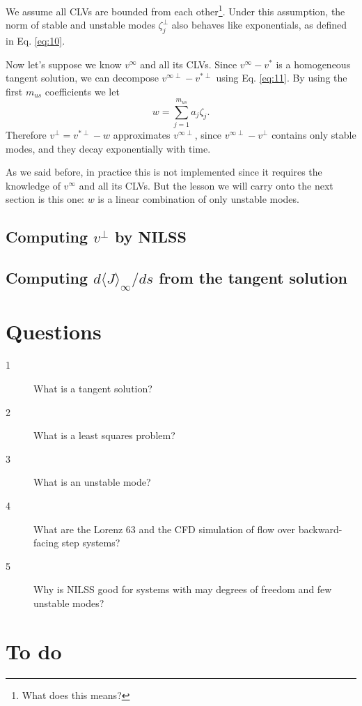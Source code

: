 \documentclass[10pt,twoside,a4paper]{article} %
\begin{document}
We assume all CLVs are bounded from each other\footnote{What does this means?}. Under this assumption, the norm of stable and unstable modes ${\zeta_j^\perp}$ also behaves like exponentials, as defined in Eq. \ref{eq:10}.

Now let's suppose we know $v^\infty$ and all its CLVs. Since $v^\infty - v^*$ is a homogeneous tangent solution, we can decompose $v^{\infty \perp} - v^{*\perp}$ using Eq. \ref{eq:11}. By using the first $m_{us}$ coefficients we let
\begin{equation}
  w= \sum_{j=1}^{m_{us}} a_j \zeta_j.
  \label{eq:12}
\end{equation}
Therefore $v^\perp = v^{*\perp} - w$ approximates $v^{\infty\perp}$, since $v^{\infty\perp} - v^\perp$ contains only stable modes, and they decay exponentially with time.

As we said before, in practice this is not implemented since it requires the knowledge of $v^\infty$ and all its CLVs. But the lesson we will carry onto the next section is this one: $w$ is a linear combination of only unstable modes.
\subsection{Computing $v^\perp$ by NILSS}\label{3.3}

\subsection{Computing $d\langle J \rangle_\infty /ds$ from the tangent solution}\label{3.4}

\section{Questions}
\begin{description}
  \item [1] What is a tangent solution?
  \item [2] What is a least squares problem?
  \item [3] What is an unstable mode?
  \item [4] What are the Lorenz 63 and the CFD simulation of flow over backward-facing step systems?
  \item [5] Why is NILSS good for systems with may degrees of freedom and few unstable modes?
\end{description}
\newpage
\section{To do}
\end{document}
